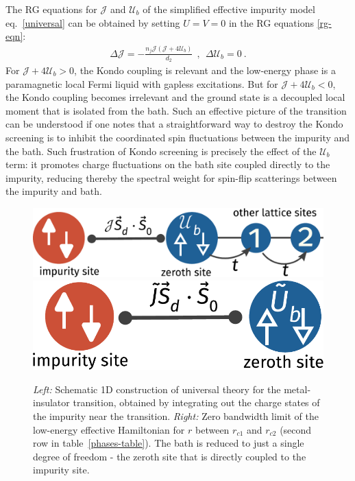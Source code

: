 \documentclass{iopart}
\begin{document}
The RG equations for \(\mathcal{J}\) and \(\mathcal{U}_b\) of the simplified effective impurity model eq.~\eqref{universal} can be obtained by setting \(U = V = 0\) in the RG equations \eqref{rg-eqn}:
\begin{eqnarray}
\label{JUb-rg}
\Delta \mathcal{J} = -\frac{n_j \mathcal{J}\left(\mathcal{J} + 4\mathcal{U}_b\right)}{d_2}~~,~~ \Delta\mathcal{U}_b = 0~.
\end{eqnarray}
For \(\mathcal{J} + 4\mathcal{U}_b > 0\), the Kondo coupling is relevant and the low-energy phase is a paramagnetic local Fermi liquid with gapless excitations. But for \(\mathcal{J} + 4\mathcal{U}_b < 0\), the Kondo coupling becomes irrelevant and the ground state is a decoupled local moment that is isolated from the bath. Such an effective picture of the transition can be understood if one notes that a straightforward way to destroy the Kondo screening is to inhibit the coordinated spin fluctuations between the impurity and the bath. Such frustration of Kondo screening is precisely the effect of the \(\mathcal{U}_b\) term: it promotes charge fluctuations on the bath site coupled directly to the impurity, reducing thereby the spectral weight for spin-flip scatterings between the impurity and bath.

\begin{figure}[htpb]
	\hspace*{\fill}
	\includegraphics[height=0.07\textheight]{universal-theory.pdf}
	\hspace*{\fill}
	\includegraphics[height=0.07\textheight]{two-site.pdf}
	\hspace*{\fill}
	\caption{{\it Left:} Schematic 1D construction of universal theory for the metal-insulator transition, obtained by integrating out the charge states of the impurity near the transition. {\it Right:} Zero bandwidth limit of the low-energy effective Hamiltonian for \(r\) between \(r_{c1}\) and \(r_{c2}\) (second row in table~\eqref{phases-table}). The bath is reduced to just a single degree of freedom - the zeroth site that is directly coupled to the impurity site.}
	\label{universal-theory}
\end{figure}
\end{document}
